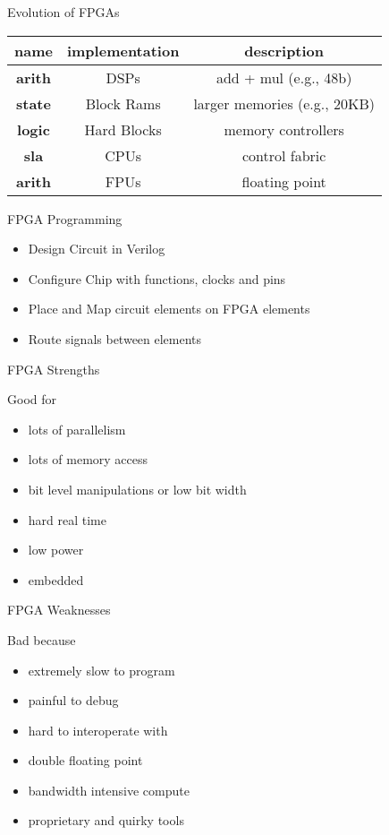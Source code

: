 \begin{frame}[fragile]{Evolution of FPGAs}

\begin{center}
\begin{tabular}{|c|c|c|}
\hline
{\bf name} & {\bf implementation} & {\bf description} \\
\hline
\hline
{\bf arith} & DSPs & add + mul (e.g., 48b) \\
{\bf state} & Block Rams & larger memories (e.g., 20KB) \\
{\bf logic} & Hard Blocks & memory controllers \\
{\bf sla}   & CPUs & control fabric \\
{\bf arith} & FPUs & floating point \\
\hline
\end{tabular}
\end{center}

\end{frame}

\begin{frame}[fragile]{FPGA Programming}

\begin{itemize}
\item Design Circuit in Verilog
\item Configure Chip with functions, clocks and pins
\item Place and Map circuit elements on FPGA elements
\item Route signals between elements 
\end{itemize}

\end{frame}

\begin{frame}[fragile]{FPGA Strengths}

Good for 
\begin{itemize}
\item lots of parallelism
\item lots of memory access
\item bit level manipulations or low bit width
\item hard real time
\item low power
\item embedded
\end{itemize}

\end{frame}

\begin{frame}[fragile]{FPGA Weaknesses}

Bad because
\begin{itemize}
\item extremely slow to program
\item painful to debug
\item hard to interoperate with
\item double floating point 
\item bandwidth intensive compute
\item proprietary and quirky tools 
\end{itemize}

\end{frame}

